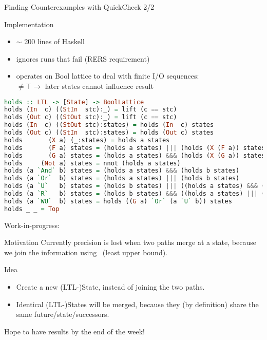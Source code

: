 \begin{frame}[fragile]{Finding Counterexamples with QuickCheck 2/2}
  \begin{block}{Implementation}
    \begin{itemize}
    \item $\sim$ 200 lines of Haskell
    \item ignores runs that fail (RERS requirement)
    \item operates on Bool lattice to deal with finite I/O sequences:\\
      $\neq\top\rightarrow$ later states cannot influence result 
    \end{itemize}
  \end{block}

  \begin{lstlisting}[language=Haskell,basicstyle=\tiny]
holds :: LTL -> [State] -> BoolLattice
holds (In  c) ((StIn  stc):_) = lift (c == stc)
holds (Out c) ((StOut stc):_) = lift (c == stc)
holds (In  c) ((StOut stc):states) = holds (In  c) states
holds (Out c) ((StIn  stc):states) = holds (Out c) states
holds       (X a) (_:states) = holds a states
holds       (F a) states = (holds a states) ||| (holds (X (F a)) states)
holds       (G a) states = (holds a states) &&& (holds (X (G a)) states)
holds     (Not a) states = nnot (holds a states)
holds (a `And` b) states = (holds a states) &&& (holds b states)
holds (a `Or`  b) states = (holds a states) ||| (holds b states)
holds (a `U`   b) states = (holds b states) ||| ((holds a states) &&& (holds (X (a `U` b)) states))
holds (a `R`   b) states = (holds b states) &&& ((holds a states) ||| (holds (X (a `R` b)) states))
holds (a `WU`  b) states = holds ((G a) `Or` (a `U` b)) states
holds _ _ = Top
  \end{lstlisting}

\end{frame}

\begin{frame}{Work-in-progress:}
  \begin{block}{Motivation}
    Currently precision is lost when two paths merge at a state,
    because we join the information using \lub\ (least upper bound).
  \end{block}
  \begin{block}{Idea}
    \begin{itemize}
    \item Create a new (LTL-)State, instead of joining the two paths.
    \item Identical (LTL-)States will be merged, because they (by
      definition) share the same future/state/successors.
    \end{itemize} 
    Hope to have results by the end of the week!
  \end{block}
\end{frame}
